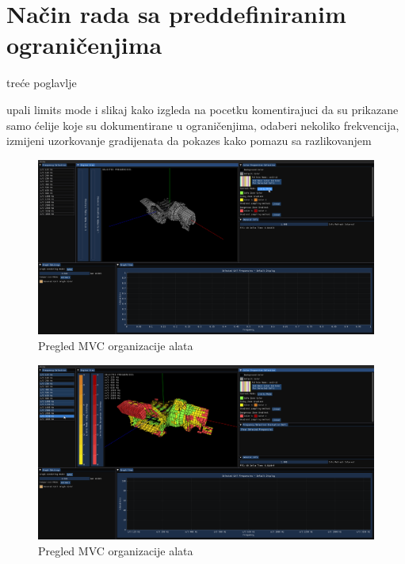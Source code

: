 \documentclass[times, utf8, diplomski]{fer}
\begin{document}
\section{Način rada sa preddefiniranim ograničenjima}
treće poglavlje

upali limits mode i slikaj kako izgleda na pocetku komentirajuci da su prikazane samo ćelije koje su dokumentirane u ograničenjima, odaberi nekoliko frekvencija, izmijeni uzorkovanje gradijenata da pokazes kako pomazu sa razlikovanjem

\begin{figure} [H]
	\centering
    \includegraphics[width=\textwidth]{demonstration/limits_mode_opened.png}
    \caption{Pregled MVC organizacije alata}
    \label{fig:high-level-overview}
\end{figure}

\begin{figure} [H]
	\centering
    \includegraphics[width=\textwidth]{demonstration/limits_mode_frq_selected.png}
    \caption{Pregled MVC organizacije alata}
    \label{fig:high-level-overview}
\end{figure}
\end{document}
